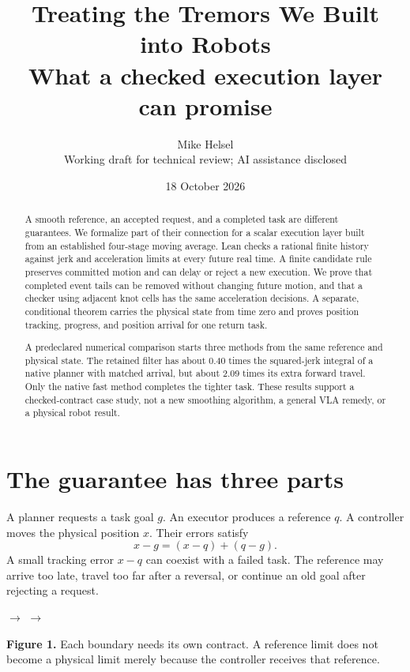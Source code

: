 \documentclass[10pt,letterpaper]{article}
\title{\vspace{-1.3em}\textbf{Treating the Tremors We Built into Robots}\\[.35em]
\large What a checked execution layer can promise}
\author{Mike Helsel\\[-.2em]\small Working draft for technical review; AI assistance disclosed}
\date{18 October 2026}
\begin{document}
\maketitle
\vspace{-.7em}
\begin{abstract}
A smooth reference, an accepted request, and a completed task are different guarantees.
We formalize part of their connection for a scalar execution layer built from an
established four-stage moving average. Lean checks a rational finite history against
jerk and acceleration limits at every future real time. A finite candidate rule
preserves committed motion and can delay or reject a new execution. We prove that
completed event tails can be removed without changing future motion, and that a
checker using adjacent knot cells has the same acceleration decisions. A separate,
conditional theorem carries the physical state from time zero and proves position
tracking, progress, and position arrival for one return task.

A predeclared numerical comparison starts three methods from the same reference
and physical state. The retained filter has about 0.40 times the squared-jerk
integral of a native planner with matched arrival, but about 2.09 times its extra
forward travel. Only the native fast method completes the tighter task. These
results support a checked-contract case study, not a new smoothing algorithm,
a general VLA remedy, or a physical robot result.
\end{abstract}

\section{The guarantee has three parts}
A planner requests a task goal $g$. An executor produces a reference $q$. A
controller moves the physical position $x$. Their errors satisfy
\begin{equation}\label{eq:split}
x-g=(x-q)+(q-g).
\end{equation}
A small tracking error $x-q$ can coexist with a failed task. The reference may
arrive too late, travel too far after a reversal, or continue an old goal after
rejecting a request.

\begin{center}
$\longrightarrow$
$\longrightarrow$
\end{center}
\textbf{Figure 1.} Each boundary needs its own contract. A reference limit does not
become a physical limit merely because the controller receives that reference.
\setcounter{figure}{1}
\end{document}
